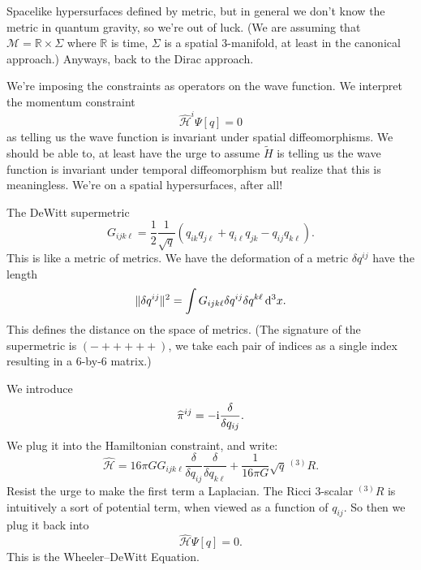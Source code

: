 \lecture

Spacelike hypersurfaces defined by metric, but in general we don't know
the metric in quantum gravity, so we're out of luck. (We are assuming
that $\mathcal{M}=\mathbb{R}\times\Sigma$ where $\mathbb{R}$ is time,
$\Sigma$ is a spatial 3-manifold, at least in the canonical approach.)
Anyways, back to the Dirac approach.

We're imposing the constraints as operators on the wave function. We
interpret the momentum constraint
\begin{equation}
\widehat{\mathcal{H}}^{i}\Psi[q] = 0
\end{equation}
as telling us the wave function is invariant under spatial
diffeomorphisms. We should be able to, at least have the urge to assume
$\widetilde{H}$ is telling us the wave function is invariant under
temporal diffeomorphism but realize that this is meaningless. We're on a
spatial hypersurfaces, after all!

The DeWitt supermetric
\begin{equation}
G_{ijk\ell} = \frac{1}{2}\frac{1}{\sqrt{q}}(q_{ik}q_{j\ell} +
q_{i\ell}q_{jk} - q_{ij}q_{k\ell}).
\end{equation}
This is like a metric of metrics. We have the deformation of a metric
$\delta q^{ij}$ have the length
\begin{equation}
\|\delta q^{ij}\|^{2} = \int G_{ijk\ell}\delta q^{ij}\delta q^{k\ell}\,\mathrm{d}^{3}x.
\end{equation}
This defines the distance on the space of metrics. (The signature of the
supermetric is $(-+++++)$, we take each pair of indices as a single
index resulting in a 6-by-6 matrix.)

We introduce
\begin{equation}
\widehat{\pi}^{ij}=-\mathrm{i}\frac{\delta}{\delta q_{ij}}.
\end{equation}
We plug it into the Hamiltonian constraint, and write:
\begin{equation}
\widehat{\mathcal{H}} = 16\pi G G_{ijk\ell}\frac{\delta}{\delta q_{ij}}\frac{\delta}{\delta q_{k\ell}}
+\frac{1}{16\pi G}\sqrt{q}\,{{}^{(3)}R}.
\end{equation}
Resist the urge to make the first term a Laplacian. The Ricci 3-scalar
${{}^{(3)}R}$ is intuitively a sort of potential term, when viewed as a
function of $q_{ij}$. So then we plug it back into
\begin{equation}
\widehat{\mathcal{H}}\Psi[q]=0.
\end{equation}
This is the Wheeler--DeWitt Equation.

